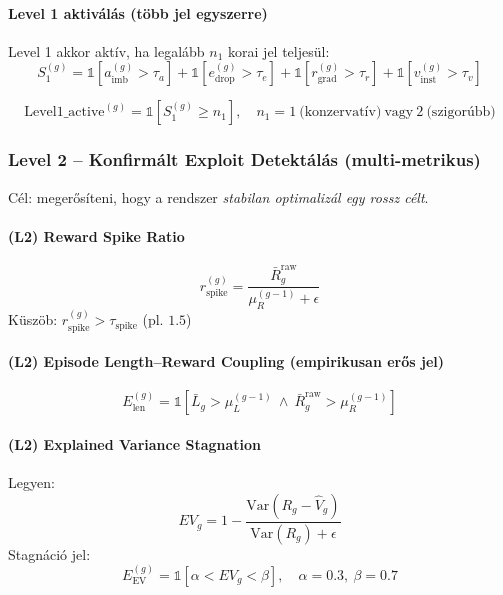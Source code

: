 \documentclass{article}
\begin{document}
\paragraph{Level 1 aktiválás (több jel egyszerre)}
Level 1 akkor aktív, ha legalább $n_1$ korai jel teljesül:
\begin{equation}
S_1^{(g)} =
\mathbb{1}[a_{\text{imb}}^{(g)}>\tau_a] +
\mathbb{1}[e_{\text{drop}}^{(g)}>\tau_e] +
\mathbb{1}[r_{\text{grad}}^{(g)}>\tau_r] +
\mathbb{1}[v_{\text{inst}}^{(g)}>\tau_v]
\end{equation}

\begin{equation}
\text{Level1\_active}^{(g)} = \mathbb{1}[S_1^{(g)} \ge n_1], \quad n_1=1\ \text{(konzervatív)}\ \text{vagy}\ 2\ \text{(szigorúbb)}
\end{equation}

\subsubsection{Level 2 -- Konfirmált Exploit Detektálás (multi-metrikus)}
Cél: megerősíteni, hogy a rendszer \textit{stabilan optimalizál egy rossz célt}.

\paragraph{(L2) Reward Spike Ratio}
\begin{equation}
r_{\text{spike}}^{(g)} = \frac{\bar{R}_g^{\text{raw}}}{\mu_R^{(g-1)}+\epsilon}
\end{equation}
Küszöb: $r_{\text{spike}}^{(g)} > \tau_{\text{spike}}$ (pl. $1.5$)

\paragraph{(L2) Episode Length--Reward Coupling (empirikusan erős jel)}
\begin{equation}
E_{\text{len}}^{(g)} = \mathbb{1}\left[\bar{L}_g > \mu_L^{(g-1)}\ \wedge\ \bar{R}_g^{\text{raw}} > \mu_R^{(g-1)}\right]
\end{equation}

\paragraph{(L2) Explained Variance Stagnation}
Legyen:
\begin{equation}
EV_g = 1 - \frac{\mathrm{Var}(R_g - \hat{V}_g)}{\mathrm{Var}(R_g)+\epsilon}
\end{equation}
Stagnáció jel:
\begin{equation}
E_{\text{EV}}^{(g)} = \mathbb{1}[\alpha < EV_g < \beta],\quad \alpha=0.3,\ \beta=0.7
\end{equation}
\end{document}
